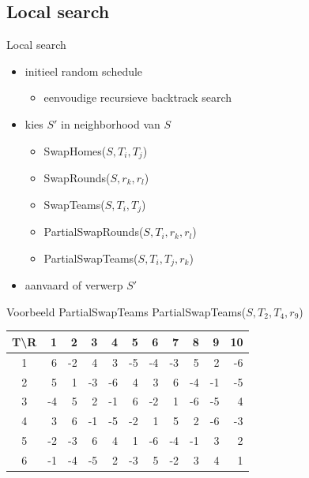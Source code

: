 \documentclass{beamer}
\begin{document}
\subsection*{Local search}
\begin{frame}{Local search}

\begin{itemize} \item initieel random schedule \pause

\begin{itemize}
 \item eenvoudige recursieve backtrack search \pause   %
\end{itemize}

\item kies $S'$ in neighborhood van $S$ \pause
\begin{itemize}
\item SwapHomes($S,T_i,T_j$) 
\item SwapRounds($S,r_k,r_l$)
\item SwapTeams($S,T_i,T_j$)
\item PartialSwapRounds($S,T_i,r_k,r_l$)
\item PartialSwapTeams($S,T_i,T_j,r_k$) 
\end{itemize} \pause


\item aanvaard of verwerp $S'$
\end{itemize}


\end{frame}

\begin{frame}{Voorbeeld PartialSwapTeams}
PartialSwapTeams($S,T_2,T_4,r_9$)

  \begin{center} \footnotesize
 \begin{tabular}{c | *{10}{r} }
  \textbf{T\textbackslash{}R} & 1 & 2 &3 & 4 & 5 & 6 & 7 & 8 & 9 & 10 \\ \hline
 1 &     6&-2&4&3&-5&-4&-3&5&2&-6 \\
 2 &    5&1&-3&-6&4&3&6&-4&\alert{-1}&-5\\
 3 &    -4&5&2&-1&6&-2&1&-6&-5&4\\
 4 &    3&6&-1&-5&-2&1&5&2&\alert{-6}&-3\\
 5&    -2&-3&6&4&1&-6&-4&-1&3&2\\
 6 &  -1&-4&-5&2&-3&5&-2&3&4&1 \\
 \end{tabular}
 \end{center}

\end{frame}
\end{document}
